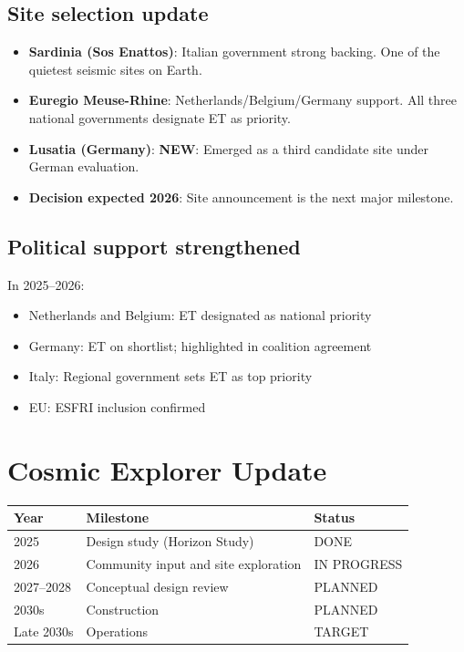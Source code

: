 \documentclass[11pt,a4paper]{article}
\newcommand{\NEW}{\textcolor{dfdblue}{\textbf{NEW}}}
\begin{document}
\subsection{Site selection update}

\begin{itemize}
\item \textbf{Sardinia (Sos Enattos)}: Italian government strong backing. One of the quietest seismic sites on Earth.
\item \textbf{Euregio Meuse-Rhine}: Netherlands/Belgium/Germany support. All three national governments designate ET as priority.
\item \textbf{Lusatia (Germany)}: \NEW: Emerged as a third candidate site under German evaluation.
\item \textbf{Decision expected 2026}: Site announcement is the next major milestone.
\end{itemize}

\subsection{Political support strengthened}

In 2025--2026:
\begin{itemize}
\item Netherlands and Belgium: ET designated as national priority
\item Germany: ET on shortlist; highlighted in coalition agreement
\item Italy: Regional government sets ET as top priority
\item EU: ESFRI inclusion confirmed
\end{itemize}

\section{Cosmic Explorer Update}

\begin{center}
\begin{tabular}{lll}
\toprule
\textbf{Year} & \textbf{Milestone} & \textbf{Status} \\
\midrule
2025 & Design study (Horizon Study) & DONE \\
2026 & Community input and site exploration & IN PROGRESS \\
2027--2028 & Conceptual design review & PLANNED \\
2030s & Construction & PLANNED \\
Late 2030s & Operations & TARGET \\
\bottomrule
\end{tabular}
\end{center}
\end{document}
